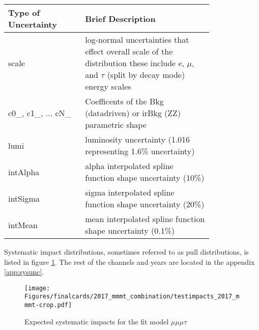 \begin{table}[h!tb]
\centering
\topcaption{
\label{tab:impact_guide}
}
\begin{tabular}{|p{0.3\linewidth}|p{0.5\linewidth}|}
\hline  
Type of Uncertainty & Brief Description \\\hline
scale & log-normal uncertainties that effect overall scale of the distribution these include e, $\mu$, and $\tau$ (split by decay mode) energy scales  \\\hline
 c0\_, c1\_, ... cN\_& Coefficents of the Bkg (datadriven) or irBkg (ZZ) parametric shape \\\hline
lumi & luminosity uncertainty (1.016 representing 1.6\% uncertainty) \\\hline
intAlpha & alpha interpolated spline function shape uncertainty (10\%) \\\hline
intSigma & sigma interpolated spline function shape uncertainty (20\%) \\\hline
intMean & mean interpolated spline function shape uncertainty (0.1\%) \\\hline
\end{tabular}
\end{table}
\clearpage 

Systematic impact distributions, sometimes referred to as pull distributions, is listed in figure \ref{fig:impacts_2017_mmmt}. The rest of the channels and years are located in the appendix \ref{app:sysunc}.

\begin{figure}[ht!b]
    \centering 
\texttt{[image: Figures/finalcards/2017\_mmmt\_combination/testimpacts\_2017\_mmmt-crop.pdf]}
    \caption{\label{fig:impacts_2017_mmmt} Expected systematic impacts for the fit model $\mu\mu\mu\tau$}
\end{figure}




